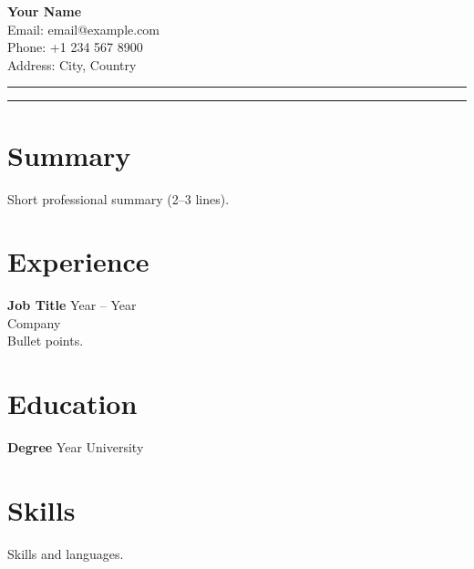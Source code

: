 \documentclass[11pt,a4paper]{article}
\begin{document}
\begin{minipage}[t]{0.72\textwidth}
\vspace{0pt}
{\LARGE \textbf{Your Name}}\\[0.25em]
Email: email@example.com \\
Phone: +1 234 567 8900 \\
Address: City, Country
\end{minipage}
\begin{minipage}[t]{0.25\textwidth}
\vspace{0pt}
\raggedleft
\rule{2.8cm}{3.2cm}
\end{minipage}

\vspace{0.5em}
\noindent\rule{\textwidth}{0.4pt}

\section*{Summary}
Short professional summary (2--3 lines).

\section*{Experience}
\textbf{Job Title} \hfill Year -- Year \\
Company \\
Bullet points.

\section*{Education}
\textbf{Degree} \hfill Year \quad University

\section*{Skills}
Skills and languages.
\end{document}
